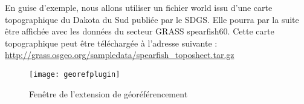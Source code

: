 
En guise d'exemple, nous allons utiliser un fichier world issu d'une carte topographique du Dakota du Sud publiée par le SDGS.
Elle pourra par la suite être affichée avec les données du secteur GRASS spearfish60. Cette carte topographique peut être téléchargée à l'adresse suivante : \url{http://grass.osgeo.org/sampledata/spearfish\_toposheet.tar.gz}


\begin{figure}[ht]
\begin{center}
  \texttt{[image: georefplugin]}
  \caption{Fenêtre de l'extension de géoréférencement \nixcaption}\label{fig:georefplugin}
\end{center}
\end{figure}

\label{georeferencer_entering}

